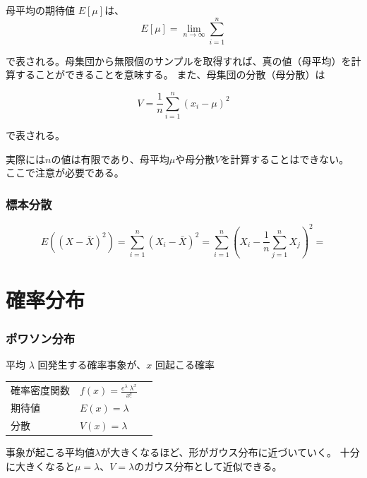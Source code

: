 母平均の期待値 $E[\mu]$は、
\begin{equation}
  E[\mu] = \lim_{n\to\infty}\sum_{i=1}^{n}
\end{equation}

で表される。母集団から無限個のサンプルを取得すれば、真の値（母平均）を計算することができることを意味する。
また、母集団の分散（母分散）は

\begin{equation}
  V= \frac{1}{n}\sum_{i=1}^{n} (x_{i}-\mu)^{2}
\end{equation}

で表される。

実際には$n$の値は有限であり、母平均$\mu$や母分散$V$を計算することはできない。
ここで注意が必要である。
\subsubsection{標本分散}
\begin{equation}
  E((X-\bar{X})^2) = \sum_{i=1}^{n} (X_i - \bar{X})^2 = \sum_{i=1}^{n} \left(X_i - \frac{1}{n}\sum_{j=1}^{n} X_j \right)^2
  =
\end{equation}

\section{確率分布}
\subsubsection{ポワソン分布}
\label{subsubsec:poisson}
平均 $\lambda$ 回発生する確率事象が、$x$ 回起こる確率

\begin{table}[h]
  \centering
  \begin{tabular}{lll}
    確率密度関数 & $f(x)=\frac{e^{\lambda}~\lambda^{x}}{x!}$   \\
    期待値      & $E(x)=\lambda$    \\
    分散        & $V(x)=\lambda$
  \end{tabular}
\end{table}

事象が起こる平均値$\lambda$が大きくなるほど、形がガウス分布に近づいていく。
十分に大きくなると$\mu=\lambda$、$V=\lambda$のガウス分布として近似できる。

